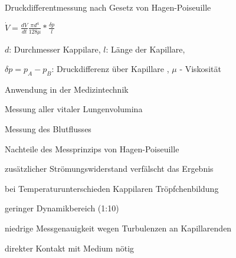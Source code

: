 \documentclass[a4paper]{article}
\begin{document}
\begin{multicols}{3}
  Druckdifferentmessung nach Gesetz von Hagen-Poiseuille
  \begin{itemize*}
    \item $\dot V=\frac{dV}{dt}\frac{\pi d^4}{128\mu}*\frac{\delta p}{l}$
    \item $d$: Durchmesser Kappilare, $l$: Länge der Kapillare,
    \item $\delta p=p_A - p_B$: Druckdifferenz über Kapillare%
    , $\mu$ - Viskosität %
  \end{itemize*}
  Anwendung in der Medizintechnik
  \begin{itemize*}
    \item Messung aller vitaler Lungenvolumina
    \item Messung des Blutflusses
  \end{itemize*}
  Nachteile des Messprinzips von Hagen-Poiseuille
  \begin{itemize*}
    \item zusätzlicher Strömungswiderstand verfälscht das Ergebnis
    \item bei Temperaturunterschieden Kappilaren Tröpfchenbildung
    \item geringer Dynamikbereich (1:10)
    \item niedrige Messgenauigkeit wegen Turbulenzen an Kapillarenden
    \item direkter Kontakt mit Medium nötig
  \end{itemize*}


\end{multicols}
\end{document}
